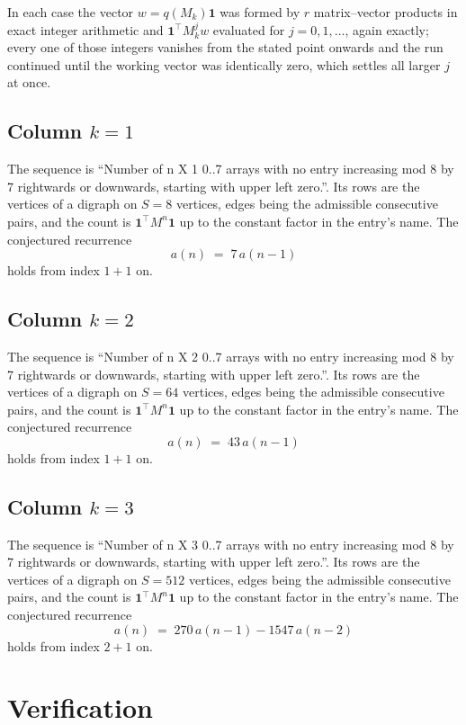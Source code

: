 \documentclass[11pt,a4paper]{article}
\theoremstyle{plain}
\theoremstyle{definition}
\begin{document}
In each case the vector $w=q(M_k)\mathbf{1}$ was formed by $r$ matrix--vector products in
exact integer arithmetic and $\mathbf{1}^{\!\top}M_k^{j}w$ evaluated for $j=0,1,\dots$,
again exactly; every one of those integers vanishes from the stated point onwards and the run
continued until the working vector was identically zero, which settles all larger $j$ at once.

\subsection*{Column $k$$=1$}
The sequence is ``Number of n X 1 0..7 arrays with no entry increasing mod 8 by 7 rightwards or downwards, starting with upper left zero.''. Its rows are the vertices of a digraph on
$S=8$ vertices, edges being the admissible consecutive pairs, and the count is
$\mathbf{1}^{\!\top}M^{n}\mathbf{1}$ up to the constant factor in the entry's name.
The conjectured recurrence
\[
a(n)\;=\;7\,a(n-1)
\]
holds from index $1+1$ on.

\subsection*{Column $k$$=2$}
The sequence is ``Number of n X 2 0..7 arrays with no entry increasing mod 8 by 7 rightwards or downwards, starting with upper left zero.''. Its rows are the vertices of a digraph on
$S=64$ vertices, edges being the admissible consecutive pairs, and the count is
$\mathbf{1}^{\!\top}M^{n}\mathbf{1}$ up to the constant factor in the entry's name.
The conjectured recurrence
\[
a(n)\;=\;43\,a(n-1)
\]
holds from index $1+1$ on.

\subsection*{Column $k$$=3$}
The sequence is ``Number of n X 3 0..7 arrays with no entry increasing mod 8 by 7 rightwards or downwards, starting with upper left zero.''. Its rows are the vertices of a digraph on
$S=512$ vertices, edges being the admissible consecutive pairs, and the count is
$\mathbf{1}^{\!\top}M^{n}\mathbf{1}$ up to the constant factor in the entry's name.
The conjectured recurrence
\[
a(n)\;=\;270\,a(n-1) - 1547\,a(n-2)
\]
holds from index $2+1$ on.

\section{Verification}
\end{document}
